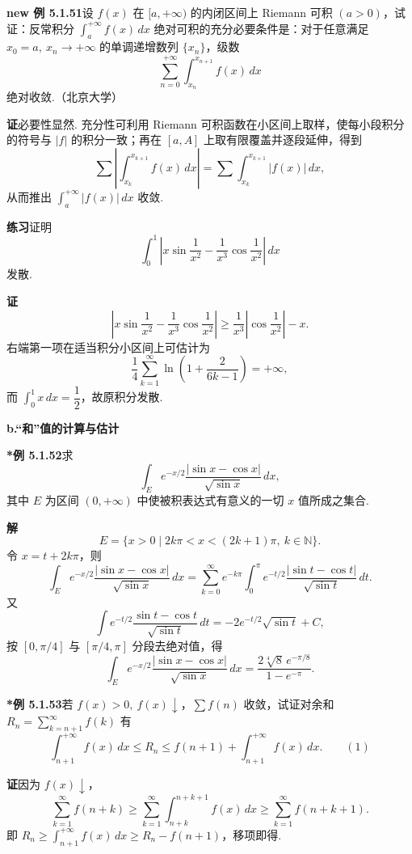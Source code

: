 \documentclass[UTF8,12pt,a4paper,fontset=fandol]{ctexart}
\begin{document}
\noindent\textbf{new 例 5.1.51}\quad 设 $f(x)$ 在 $[a,+\infty)$ 的内闭区间上 Riemann 可积 $(a>0)$，试证：反常积分 $\displaystyle\int_a^{+\infty}f(x)\,dx$ 绝对可积的充分必要条件是：对于任意满足 $x_0=a,\ x_n\to+\infty$ 的单调递增数列 $\{x_n\}$，级数
\[
  \sum_{n=0}^{+\infty}\int_{x_n}^{x_{n+1}}f(x)\,dx
\]
绝对收敛.（北京大学）

\noindent\textbf{证}\quad 必要性显然. 充分性可利用 Riemann 可积函数在小区间上取样，使每小段积分的符号与 $|f|$ 的积分一致；再在 $[a,A]$ 上取有限覆盖并逐段延伸，得到
\[
  \sum\left|\int_{x_k}^{x_{k+1}}f(x)\,dx\right|
  =\sum\int_{x_k}^{x_{k+1}}|f(x)|\,dx,
\]
从而推出 $\displaystyle\int_a^{+\infty}|f(x)|\,dx$ 收敛.

\noindent\textbf{练习}\quad 证明
\[
  \int_0^1\left|x\sin\frac1{x^2}-\frac1{x^3}\cos\frac1{x^2}\right|\,dx
\]
发散.

\noindent\textbf{证}\quad
\[
  \left|x\sin\frac1{x^2}-\frac1{x^3}\cos\frac1{x^2}\right|
  \ge\frac1{x^3}\left|\cos\frac1{x^2}\right|-x.
\]
右端第一项在适当积分小区间上可估计为
\[
  \frac14\sum_{k=1}^{\infty}\ln\left(1+\frac2{6k-1}\right)=+\infty,
\]
而 $\int_0^1x\,dx=\dfrac12$，故原积分发散.

\noindent\textbf{b.\quad “和”值的计算与估计}

\noindent\textbf{*例 5.1.52}\quad 求
\[
  \int_E e^{-x/2}\frac{|\sin x-\cos x|}{\sqrt{\sin x}}\,dx,
\]
其中 $E$ 为区间 $(0,+\infty)$ 中使被积表达式有意义的一切 $x$ 值所成之集合.

\noindent\textbf{解}\quad
\[
  E=\{x>0\mid 2k\pi<x<(2k+1)\pi,\ k\in\mathbb N\}.
\]
令 $x=t+2k\pi$，则
\[
  \int_E e^{-x/2}\frac{|\sin x-\cos x|}{\sqrt{\sin x}}\,dx
  =\sum_{k=0}^{\infty}e^{-k\pi}\int_0^\pi
  e^{-t/2}\frac{|\sin t-\cos t|}{\sqrt{\sin t}}\,dt.
\]
又
\[
  \int e^{-t/2}\frac{\sin t-\cos t}{\sqrt{\sin t}}\,dt
  =-2e^{-t/2}\sqrt{\sin t}+C,
\]
按 $[0,\pi/4]$ 与 $[\pi/4,\pi]$ 分段去绝对值，得
\[
  \int_E e^{-x/2}\frac{|\sin x-\cos x|}{\sqrt{\sin x}}\,dx
  =\frac{2\sqrt[4]8\,e^{-\pi/8}}{1-e^{-\pi}}.
\]

\noindent\textbf{*例 5.1.53}\quad 若 $f(x)>0,\ f(x)\downarrow$，$\displaystyle\sum f(n)$ 收敛，试证对余和 $R_n=\displaystyle\sum_{k=n+1}^{\infty}f(k)$ 有
\[
  \int_{n+1}^{+\infty}f(x)\,dx\le R_n\le f(n+1)+\int_{n+1}^{+\infty}f(x)\,dx.
\qquad(1)
\]

\noindent\textbf{证}\quad 因为 $f(x)\downarrow$，
\[
  \sum_{k=1}^{\infty}f(n+k)
  \ge\sum_{k=1}^{\infty}\int_{n+k}^{n+k+1}f(x)\,dx
  \ge\sum_{k=1}^{\infty}f(n+k+1).
\]
即 $R_n\ge\int_{n+1}^{+\infty}f(x)\,dx\ge R_n-f(n+1)$，移项即得.
\end{document}
